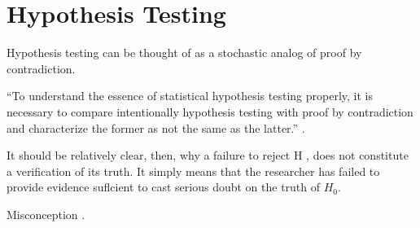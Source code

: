 \hypertarget{ch:hypothesis}{%
\chapter{Hypothesis Testing}\label{ch:hypothesis}}

Hypothesis testing can be thought of as a stochastic analog of proof by
contradiction.

``To understand the essence of statistical hypothesis testing properly, it is
necessary to compare intentionally hypothesis testing with proof by
contradiction and characterize the former as not the same as the latter.''
\citep{otani2019comparing}.

It should be relatively clear, then, why a failure to reject H , does not
constitute a verification of its truth. It simply means that the researcher has
failed to provide evidence suflcient to cast serious doubt on the truth of
\(H_0\). \citep{reeves1980hypothesis}

Misconception \citep{falk1995significance}.

